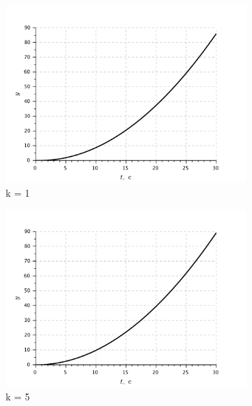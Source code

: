 \documentclass[a4paper, 11pt]{article}
\begin{document}
\begin{figure}[h!]
    \centering
    \begin{subfigure}{0.33\textwidth}
        \centering
        \includegraphics[width = \textwidth]{images/graph2-3-K1.pdf}
        \caption{k = 1}
    \end{subfigure}
    \begin{subfigure}{0.33\textwidth}
        \centering
        \includegraphics[width = \textwidth]{images/graph2-3-K5.pdf}
        \caption{k = 5}
    \end{subfigure}
    \begin{subfigure}{0.33\textwidth}
        \centering

\end{subfigure}
\end{figure}
\end{document}
